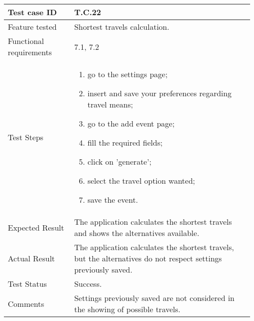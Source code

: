 \begin{table}[H]
	\begin{center}
		\begin{tabular}{ | p{} | p{} | }
		\hline
		Test case ID & T.C.22\\
		\hline
		Feature tested & Shortest travels calculation.\\
    	\hline
		Functional requirements & 7.1, 7.2  \\
		\hline
		Test Steps & 
			\begin{enumerate}
			\item go to the settings page;
			\item insert and save your preferences regarding travel means;
				\item go to the add event page;
				\item fill the required fields;
				\item click on 'generate';
				\item select the travel option wanted;
				\item save the event.
			\end{enumerate} \\
		\hline
		Expected Result & The application calculates the shortest travels and shows the alternatives available.\\
		\hline
		Actual Result & The application calculates the shortest travels, but the alternatives do not respect settings previously saved.\\ 
		\hline
		Test Status & \color{ForestGreen}Success.\\ 
		\hline
		Comments & Settings previously saved are not considered in the showing of possible travels.\\ 
		\hline
		
		\end{tabular}
	\end{center}
\end{table}

